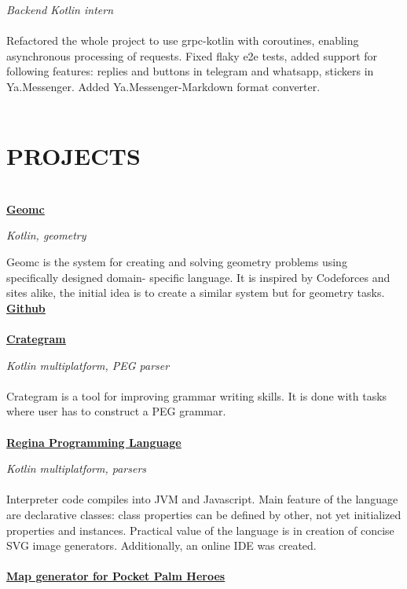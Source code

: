 \documentclass{article}
\begin{document}
\noindent \textit{Backend Kotlin intern}
\\\\
\noindent Refactored the whole project to use grpc-kotlin with coroutines, enabling asynchronous processing of requests. Fixed flaky e2e tests, added support for following features: replies and buttons in telegram and whatsapp, stickers in Ya.Messenger. Added Ya.Messenger-Markdown format converter.
\\\\
\section*{PROJECTS}
\makebox[530pt]{\rule{570pt}{0.4pt}}\\
\noindent\href{https://45.156.25.18/}{{\textbf{\underline{Geomc}}}}

\noindent\textit{Kotlin, geometry}

\noindent Geomc is the system for creating and solving geometry problems using specifically designed domain-
specific language. It is inspired by Codeforces and sites alike, the initial idea is to create a similar system
but for geometry tasks. \href{https://github.com/konichiva-geom/GeometryChecker/}{{\textbf{\underline{Github}}}}
\\\\
\noindent\href{https://llesha.github.io/CrateGram/}{{\textbf{\underline{Crategram}}}}

\noindent\textit{Kotlin multiplatform, PEG parser}
\\\\
\noindent Crategram is a tool for improving grammar writing skills. It is done with tasks where user has to construct
a PEG grammar.
\\\\
\noindent\href{https://llesha.github.io/regina-ide/}{{\textbf{\underline{Regina Programming Language}}}}

\noindent\textit{Kotlin multiplatform, parsers}
\\\\
\noindent Interpreter code compiles into JVM and Javascript. Main feature of the language are declarative classes: class properties can be defined by other, not yet initialized properties and instances. Practical value of the language is in creation of concise SVG image generators. Additionally, an online IDE was created.
\\\\
\noindent\href{https://github.com/llesha/MapGen-KorGE}{{\textbf{\underline{Map generator for Pocket Palm Heroes}}}}
\end{document}
